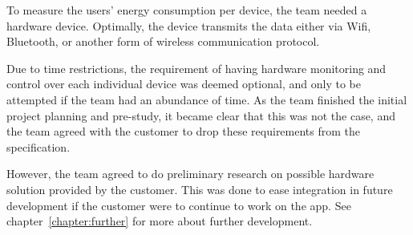 \noindent To measure the users' energy consumption per device, the team needed a hardware device. Optimally, the device transmits the data either via Wifi, Bluetooth, or another form of wireless communication protocol.

Due to time restrictions, the requirement of having hardware monitoring and control over each individual device was deemed optional, and only to be attempted if the team had an abundance of time. As the team finished the initial project planning and pre-study, it became clear that this was not the case, and the team agreed with the customer to drop these requirements from the specification. 

However, the team agreed to do preliminary research on possible hardware solution provided by the customer. This was done to ease integration in future development if the customer were to continue to work on the app. See chapter~\ref{chapter:further} for more about further development.
\newpage
 
